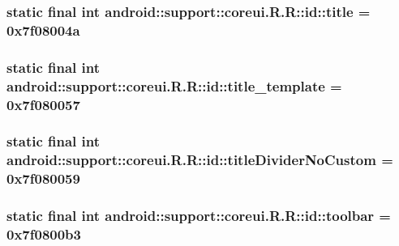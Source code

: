 \hypertarget{classandroid_1_1support_1_1coreui_1_1_r_1_1id_b9f0c1f1fe7f4c391e85ad6c1ed7d341}{
\subsubsection[{title}]{\setlength{\rightskip}{0pt plus 5cm}static final int android::support::coreui.R.R::id::title = 0x7f08004a}}
\label{classandroid_1_1support_1_1coreui_1_1_r_1_1id_b9f0c1f1fe7f4c391e85ad6c1ed7d341}


\hypertarget{classandroid_1_1support_1_1coreui_1_1_r_1_1id_1821561581dcf84710261795cfb2dfae}{
\subsubsection[{title\_\-template}]{\setlength{\rightskip}{0pt plus 5cm}static final int android::support::coreui.R.R::id::title\_\-template = 0x7f080057}}
\label{classandroid_1_1support_1_1coreui_1_1_r_1_1id_1821561581dcf84710261795cfb2dfae}


\hypertarget{classandroid_1_1support_1_1coreui_1_1_r_1_1id_73897d6625a2323cd5bc926c7ac81672}{
\subsubsection[{titleDividerNoCustom}]{\setlength{\rightskip}{0pt plus 5cm}static final int android::support::coreui.R.R::id::titleDividerNoCustom = 0x7f080059}}
\label{classandroid_1_1support_1_1coreui_1_1_r_1_1id_73897d6625a2323cd5bc926c7ac81672}


\hypertarget{classandroid_1_1support_1_1coreui_1_1_r_1_1id_2c48b85c26c4973ca3b2d0e12ddaee28}{
\subsubsection[{toolbar}]{\setlength{\rightskip}{0pt plus 5cm}static final int android::support::coreui.R.R::id::toolbar = 0x7f0800b3}}
\label{classandroid_1_1support_1_1coreui_1_1_r_1_1id_2c48b85c26c4973ca3b2d0e12ddaee28}


